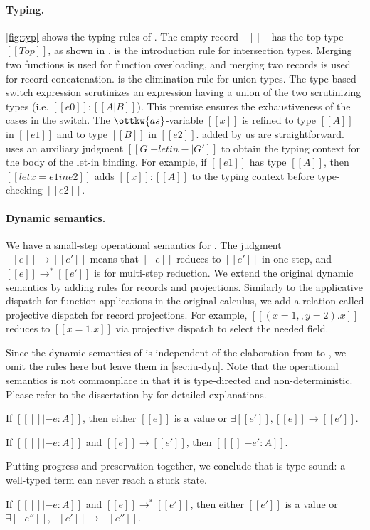\paragraph{Typing.}
\autoref{fig:typ} shows the typing rules of \lambdaiu. The empty record $[[{}]]$
has the top type $[[Top]]$, as shown in .  is the
introduction rule for intersection types. Merging two functions is used for
function overloading, and merging two records is used for record concatenation.
 is the elimination rule for union types. The type-based switch
expression scrutinizes an expression having a union of the two scrutinizing
types (i.e. $[[e0]]:[[A|B]]$). This premise ensures the exhaustiveness of the
cases in the switch. The $\ottkw{as}$-variable $[[x]]$ is refined to type
$[[A]]$ in $[[e1]]$ and to type $[[B]]$ in $[[e2]]$.
 added by us are straightforward. 
uses an auxiliary judgment $[[G |- letin -| G']]$ to obtain the typing context
for the body of the let-in binding. For example, if $[[e1]]$ has type $[[A]]$,
then $[[let x = e1 in e2]]$ adds $[[x]]:[[A]]$ to the typing context before
type-checking $[[e2]]$.

\paragraph{Dynamic semantics.}
We have a small-step operational semantics for \lambdaiu. The judgment
$[[e]]\longrightarrow[[e']]$ means that $[[e]]$ reduces to $[[e']]$ in one step,
and $[[e]]\longrightarrow^*[[e']]$ is for multi-step reduction. We extend the
original dynamic semantics by adding rules for records and projections.
Similarly to the applicative dispatch for function applications in the original
calculus, we add a relation called projective dispatch for record projections.
For example, $[[({x = 1},,{y = 2}).x]]$ reduces to $[[{x = 1}.x]]$ via
projective dispatch to select the needed field.

Since the dynamic semantics of \lambdaiu is independent of the elaboration from
\uaena to \lambdaiu, we omit the rules here but leave them in
\autoref{sec:iu-dyn}. Note that the operational semantics is not commonplace in
that it is type-directed and non-deterministic. Please refer to the dissertation
by \citet{rehman2023blend} for detailed explanations.

\begin{theorem}[Progress]
  If $[[ [] |- e : A]]$, then either $[[e]]$ is a value or $\exists [[e']], [[e]] \longrightarrow [[e']]$.
\end{theorem}
\begin{theorem}[Preservation]
  If $[[ [] |- e : A]]$ and $[[e]] \longrightarrow [[e']]$, then $[[ [] |- e' : A]]$.
\end{theorem}
Putting progress and preservation together, we conclude that \lambdaiu is type-sound:
a well-typed term can never reach a stuck state.
\begin{corollary}
  If $[[ [] |- e : A]]$ and $[[e]] \longrightarrow^* [[e']]$, then either $[[e']]$ is a value or $\exists [[e'']], [[e']] \longrightarrow [[e'']]$.
\end{corollary}

